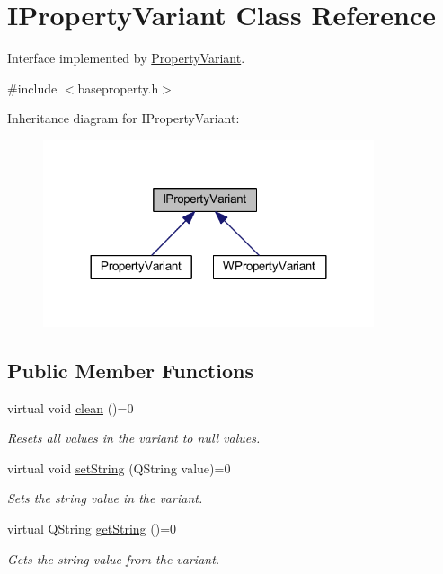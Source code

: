 \hypertarget{class_i_property_variant}{\section{I\-Property\-Variant Class Reference}
\label{class_i_property_variant}
}


Interface implemented by \hyperlink{class_property_variant}{Property\-Variant}.  




{\ttfamily \#include $<$baseproperty.\-h$>$}



Inheritance diagram for I\-Property\-Variant\-:
\nopagebreak
\begin{figure}[H]
\begin{center}
\leavevmode
\includegraphics[width=276pt]{class_i_property_variant__inherit__graph}
\end{center}
\end{figure}
\subsection*{Public Member Functions}
\begin{DoxyCompactItemize}
\item 
\hypertarget{class_i_property_variant_aa2778a10bb1fb7f7e75a98e67ceffe55}{virtual void \hyperlink{class_i_property_variant_aa2778a10bb1fb7f7e75a98e67ceffe55}{clean} ()=0}\label{class_i_property_variant_aa2778a10bb1fb7f7e75a98e67ceffe55}

\begin{DoxyCompactList}\small\item\em Resets all values in the variant to null values. \end{DoxyCompactList}\item 
virtual void \hyperlink{class_i_property_variant_adb4d0ea9e57d36143d32756f499b195e}{set\-String} (Q\-String value)=0
\begin{DoxyCompactList}\small\item\em Sets the string value in the variant. \end{DoxyCompactList}\item 
virtual Q\-String \hyperlink{class_i_property_variant_aac10233635827519d895aacdc428af64}{get\-String} ()=0
\begin{DoxyCompactList}\small\item\em Gets the string value from the variant. \end{DoxyCompactList}\end{DoxyCompactItemize}


